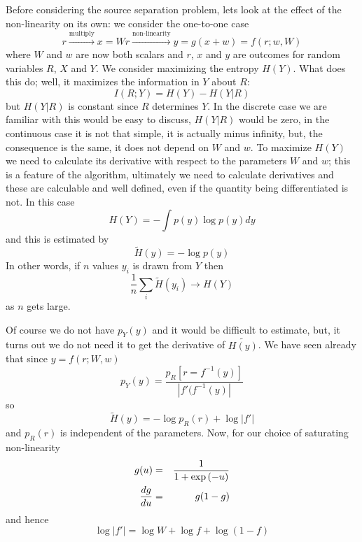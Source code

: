 \documentclass[12pt]{article}
\begin{document}
Before considering the source separation problem, lets look at the
effect of the non-linearity on its own: we consider the one-to-one
case
\begin{equation}
r\stackrel{\mbox{multiply}}{\longrightarrow}x=Wr\stackrel{\mbox{non-linearity}}{\longrightarrow}y=g(x+w)=f(r;w,W)
\end{equation}
where $W$ and $w$ are now both scalars and $r$, $x$ and $y$ are
outcomes for random variables $R$, $X$ and $Y$. We consider maximizing
the entropy $H(Y)$. What does this do; well, it maximizes the
information in $Y$ about $R$:
\begin{equation}
I(R;Y)=H(Y)-H(Y|R)
\end{equation}
but $H(Y|R)$ is constant since $R$ determines $Y$. In the discrete
case we are familiar with this would be easy to discuss, $H(Y|R)$
would be zero, in the continuous case it is not that simple, it is
actually minus infinity, but, the consequence is the same, it does not
depend on $W$ and $w$. To maximize $H(Y)$ we need to calculate its
derivative with respect to the parameters $W$ and $w$; this is a
feature of the algorithm, ultimately we need to calculate derivatives
and these are calculable and well defined, even if the quantity being
differentiated is not. In this case
\begin{equation}
H(Y)=-\int p(y)\log{p(y)} dy
\end{equation}
and this is estimated by
\begin{equation}
\tilde{H}(y)=-\log{p(y)}
\end{equation}
In other words, if $n$ values $y_i$ is drawn from $Y$ then 
\begin{equation}
\frac{1}{n}\sum_i\tilde{H}(y_i)\rightarrow H(Y)
\end{equation}
as $n$ gets large. 

Of course we do not have $p_Y(y)$ and it would be difficult to
estimate, but, it turns out we do not need it to get the derivative of
$\tilde{H(y)}$. We have seen already that since $y=f(r;W,w)$
\begin{equation}
p_Y(y)=\frac{p_R[r=f^{-1}(y)]}{|f'(f^{-1}(y)|}
\end{equation}
so
\begin{equation}
\tilde{H}(y)=-\log{p_R(r)}+\log{|f'|}
\end{equation}
and $p_R(r)$ is independent of the parameters. Now, for our choice of saturating non-linearity
\begin{eqnarray}
g(u)&=&\frac{1}{1+\exp{(-u)}}\cr
\frac{dg}{du}&=&g(1-g)
\end{eqnarray}
and hence
\begin{equation}
\log{|f'|}=\log{W}+\log{f}+\log{(1-f)}
\end{equation}
\end{document}
